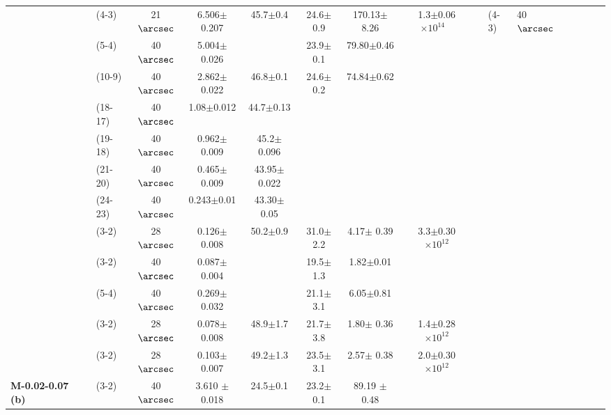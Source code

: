 \begin{longtable}{lrlcccccc}
                                 &              & (4-3) & 21$\arcsec$ &  6.506$\pm$0.207 &  45.7$\pm$0.4 &  24.6$\pm$0.9 &  170.13$\pm$ 8.26 &  1.3$\pm$0.06 $\times 10^{14}$ \  
                                 &             &  (4-3)\footnotemark[b]  & 40$\arcsec$  & & & & & \\
                                 &             &  (5-4)\footnotemark[a] & 40$\arcsec$ & 5.004$\pm$0.026 & & 23.9$\pm$0.1 & 79.80$\pm$0.46& \\
 				&             &  (10-9)\footnotemark[a] & 40$\arcsec$ & 2.862$\pm$0.022 & 46.8$\pm$0.1    &24.6$\pm$0.2 & 74.84$\pm$0.62& \\
 				&             &  (18-17)                & 40$\arcsec$ & 1.08$\pm$0.012  & 44.7$\pm$0.13   &             &  & \\
 				&             &  (19-18)                & 40$\arcsec$ & 0.962$\pm$0.009 & 45.2$\pm$0.096  &             &  & \\
 				&             &  (21-20)                & 40$\arcsec$ & 0.465$\pm$0.009 & 43.95$\pm$0.022 &             &  & \\
 				&             &  (24-23)                & 40$\arcsec$ & 0.243$\pm$0.01  & 43.30$\pm$0.05  &             &  & \\
                                 & \isoa & (3-2)    &  28$\arcsec$   &  0.126$\pm$0.008 &  50.2$\pm$0.9 &  31.0$\pm$2.2 &    4.17$\pm$ 0.39 &  3.3$\pm$0.30 $\times 10^{12}$ \\
 				&    		&  (3-2)\footnotemark[a] & 40$\arcsec$ & 0.087$\pm$0.004 & & 19.5$\pm$1.3 & 1.82$\pm$0.01 & \\
                                 &             &  (5-4)\footnotemark[a] & 40$\arcsec$ & 0.269$\pm$0.032 & & 21.1$\pm$3.1 & 6.05$\pm$0.81 & \\
                                 & \isob & (3-2)     & 28$\arcsec$ &  0.078$\pm$0.008 &  48.9$\pm$1.7 &  21.7$\pm$3.8 &    1.80$\pm$ 0.36 &  1.4$\pm$0.28 $\times 10^{12}$ \\
                                 & \isoc & (3-2)    & 28$\arcsec$  & 0.103$\pm$0.007 &  49.2$\pm$1.3 &  23.5$\pm$3.1 &    2.57$\pm$ 0.38 &  2.0$\pm$0.30 $\times 10^{12}$ \\
\hline
 {\bf M-0.02-0.07  (b)} & \cyano & (3-2)\footnotemark[a]  & 40$\arcsec$ & 3.610 $\pm$0.018 & 24.5$\pm$0.1 & 23.2$\pm$0.1 & 89.19 $\pm$0.48 &   \\   

\end{longtable}
